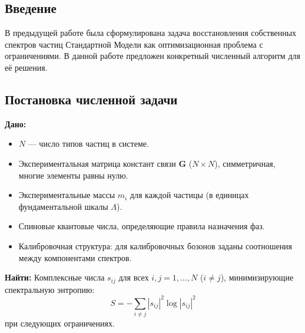 \documentclass[12pt,a4paper]{article}
\begin{document}
\begin{abstract}
Предложен численный алгоритм для восстановления собственных спектров частиц Стандартной Модели в рамках Теории Мод. Задача сформулирована как нелинейная оптимизация с ограничениями, где целевой функцией является спектральная энтропия, а ограничениями --- экспериментальные массы, константы связи, принцип компенсации и калибровочные симметрии. Предложен метод предобработки для понижения размерности, комбинированный алгоритм на основе градиентного спуска Adam с последовательным увеличением штрафных множителей (SUMT). Приведён псевдокод, оценка вычислительной сложности и анализ особых случаев (безмассовые частицы). Показано, что для $N = 30$--$40$ типов частиц задача решается за секунды на стандартном CPU.

\bigskip
\noindent\textbf{Ключевые слова:} Теория Мод, численная оптимизация, спектральная энтропия, восстановление спектров, Стандартная Модель.
\end{abstract}

\subsection{Введение}
В предыдущей работе была сформулирована задача восстановления собственных спектров частиц Стандартной Модели как оптимизационная проблема с ограничениями. В данной работе предложен конкретный численный алгоритм для её решения.

\subsection{Постановка численной задачи}
\textbf{Дано:}
\begin{itemize}
    \item $N$ --- число типов частиц в системе.
    \item Экспериментальная матрица констант связи $\mathbf{G}$ ($N \times N$), симметричная, многие элементы равны нулю.
    \item Экспериментальные массы $m_i$ для каждой частицы (в единицах фундаментальной шкалы $\Lambda$).
    \item Спиновые квантовые числа, определяющие правила назначения фаз.
    \item Калибровочная структура: для калибровочных бозонов заданы соотношения между компонентами спектров.
\end{itemize}

\textbf{Найти:}
Комплексные числа $s_{ij}$ для всех $i, j = 1,\dots,N$ ($i \neq j$), минимизирующие спектральную энтропию:
\begin{equation}
    S = -\sum_{i \neq j} |s_{ij}|^2 \log|s_{ij}|^2
\end{equation}
при следующих ограничениях.
\end{document}
